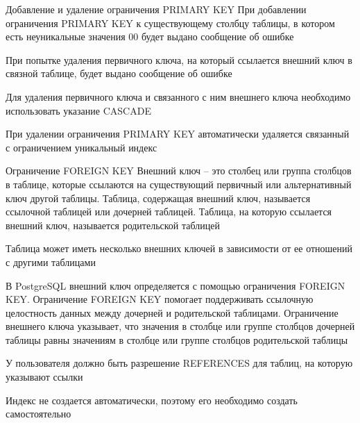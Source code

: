 \documentclass[12pt]{article}
\begin{document}
\begin{Remark}{Добавление и удаление ограничения PRIMARY KEY}
    При добавлении ограничения PRIMARY KEY к существующему столбцу таблицы, в котором есть неуникальные значения 00 будет выдано сообщение об ошибке 

    При попытке удаления первичного ключа, на который ссылается внешний ключ в связной таблице, будет выдано сообщение об ошибке 

    Для удаления первичного ключа и связанного с ним внешнего ключа необходимо использовать указание CASCADE

    При удалении ограничения PRIMARY KEY автоматически удаляется связанный с ограничением уникальный индекс 
\end{Remark}

\begin{nota}{Ограничение FOREIGN KEY}
    Внешний ключ -- это столбец или группа столбцов в таблице, которые ссылаются на существующий первичный или альтернативный ключ другой таблицы. Таблица, содержащая внешний ключ, называется ссылочной таблицей или дочерней таблицей. Таблица, на которую ссылается внешний ключ, называется родительской таблицей 

    Таблица может иметь несколько внешних ключей в зависимости от ее отношений с другими таблицами 

    В PostgreSQL внешний ключ определяется с помощью ограничения FOREIGN KEY. Ограничение FOREIGN KEY помогает поддерживать ссылочную целостность данных между дочерней и родительской таблицами. Ограничение внешнего ключа указывает, что значения в столбце или группе столбцов дочерней таблицы равны значениям в столбце или группе столбцов родительской таблицы

    У пользователя должно быть разрешение REFERENCES для таблиц, на которую указывают ссылки 

    Индекс не создается автоматически, поэтому его необходимо создать самостоятельно 
\end{nota}
\end{document}
